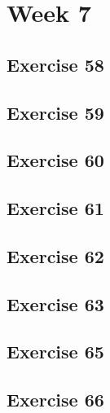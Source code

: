 \documentclass[a4paper]{article}
\let\stdsection\section
\renewcommand\section{\newpage\stdsection}
\begin{document}
\section*{Week 7}

\subsection*{Exercise 58}




\newpage
\subsection*{Exercise 59}


\newpage
\subsection*{Exercise 60}


\newpage
\subsection*{Exercise 61}


\newpage
\subsection*{Exercise 62}


\newpage
\subsection*{Exercise 63}


\newpage
\subsection*{Exercise 65}









\newpage
\subsection*{Exercise 66}

\end{document}
